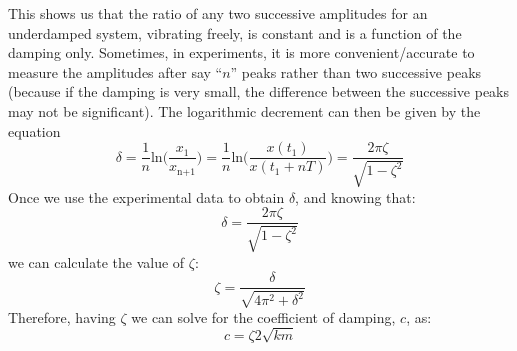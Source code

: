 \documentclass[12pt,letter]{article}
\begin{document}
			This shows us that the ratio of any two successive amplitudes for an underdamped system, vibrating freely, is constant and is a function of the damping only. Sometimes, in experiments, it is more convenient/accurate to measure the amplitudes after say ``$n$'' peaks rather than two successive peaks (because if the damping is very small, the difference between the successive
			peaks may not be significant). The logarithmic decrement can then be given by the equation
			\begin{equation}
				\delta = \frac{1}{n}\text{ln}\bigg(\frac{x_{\text{1}}}{x_{\text{n+1}}}\bigg) =   \frac{1}{n}\text{ln}\bigg(\frac{x(t_{\text{1}})}{x(t_{\text{1}}+nT)}\bigg) = \frac{2 \pi \zeta}{\sqrt{1-\zeta^2}}
			\end{equation}				
			Once we use the experimental data to obtain $\delta$, and knowing that:
			\begin{equation}
				\delta = \frac{2 \pi \zeta}{\sqrt{1-\zeta^2}}
			\end{equation}	
			we can calculate the value of $\zeta$:
			\begin{equation}
				\zeta = \frac{\delta}{\sqrt{4\pi^2+\delta^2}}
			\end{equation}
			Therefore, having $\zeta$ we can solve for the coefficient of damping, $c$, as: 
			\begin{equation}
				c = \zeta 2\sqrt{km}
			\end{equation}					
\end{document}
